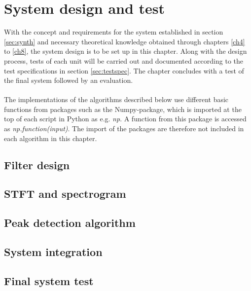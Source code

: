 \chapter{System design and test} \label{ch10}
With the concept and requirements for the system established in section \ref{sec:synth} and necessary theoretical knowledge obtained through chapters \ref{ch4} to \ref{ch8}, the system design is to be set up in this chapter. Along with the design process, tests of each unit will be carried out and documented according to the test specifications in section \ref{sec:testspec}. The chapter concludes with a test of the final system followed by an evaluation.
\\ \\
The implementations of the algorithms described below use different basic functions from packages such as the Numpy-package, which is imported at the top of each script in Python as e.g. \textit{np}. A function from this package is accessed as \textit{np.function(input)}. The import of the packages are therefore not included in each algorithm in this chapter.



\section{Filter design}


\section{STFT and spectrogram}


\section{Peak detection algorithm}


\section{System integration}


\section{Final system test}
